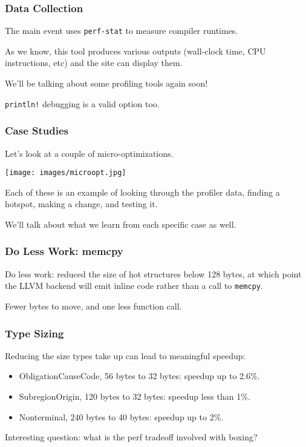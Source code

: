 \begin{frame}
\frametitle{Data Collection}

The main event uses \texttt{perf-stat} to measure compiler runtimes.

As we know, this tool produces various outputs (wall-clock time, CPU
instructions, etc) and the site can display them.

We'll be talking about some profiling tools again soon!

\texttt{println!} debugging is a valid option too. 

\end{frame}


\begin{frame}
\frametitle{Case Studies}

Let's look at a couple of micro-optimizations. 

\begin{center}
	\texttt{[image: images/microopt.jpg]}
\end{center}

Each of these is an example of looking through
the profiler data, finding a hotspot, making a change, and testing it. 

We'll talk
about what we learn from each specific case as well.

\end{frame}


\begin{frame}
\frametitle{Do Less Work: memcpy}

Do less work: reduced the size of hot structures below 128 bytes, at which point the LLVM backend will emit inline code rather than a call to \texttt{memcpy}.


Fewer bytes to move, and one less function call.


\end{frame}


\begin{frame}
\frametitle{Type Sizing}
Reducing the size types take up can lead to meaningful speedup:

\begin{itemize}
\item ObligationCauseCode, 56 bytes to 32 bytes: speedup up to 2.6\%.
\item SubregionOrigin, 120 bytes to 32 bytes: speedup less than 1\%.
\item Nonterminal, 240 bytes to 40 bytes: speedup up to 2\%.
\end{itemize}

Interesting question: what is the perf tradeoff involved with boxing?

\end{frame}



